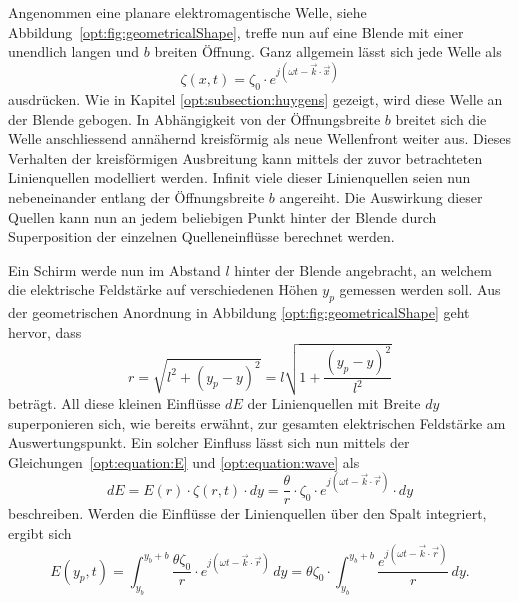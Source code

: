 Angenommen eine planare elektromagentische Welle, siehe Abbildung~\ref{opt:fig:geometricalShape}, treffe nun auf eine Blende mit einer unendlich langen und $b$ breiten Öffnung.
Ganz allgemein lässt sich jede Welle als
\begin{equation}
\zeta(x, t)
=
\zeta_0 \cdot e^{j(\omega t - \vec{k}\cdot\vec{x})}
\label{opt:equation:wave}
\end{equation}
ausdrücken.
Wie in Kapitel \ref{opt:subsection:huygens} gezeigt, wird diese Welle an der Blende gebogen.
In Abhängigkeit von der Öffnungsbreite $b$ breitet sich die Welle anschliessend annähernd kreisförmig als neue Wellenfront weiter aus.
Dieses Verhalten der kreisförmigen Ausbreitung kann mittels der zuvor betrachteten Linienquellen modelliert werden.
Infinit viele dieser Linienquellen seien nun nebeneinander entlang der Öffnungsbreite $b$ angereiht.
Die Auswirkung dieser Quellen kann nun an jedem beliebigen Punkt hinter der Blende durch Superposition der einzelnen Quelleneinflüsse berechnet werden.

Ein Schirm werde nun im Abstand $l$ hinter der Blende angebracht, an welchem die elektrische Feldstärke auf verschiedenen Höhen $y_p$ gemessen werden soll.
Aus der geometrischen Anordnung in Abbildung \ref{opt:fig:geometricalShape} geht hervor, dass
\begin{equation}
r
=
\sqrt{l^2 + (y_p-y)^2}
=
l \sqrt{1 + \frac{(y_p-y)^2}{l^2}}
\label{opt:equation:distance_r}
\end{equation}
beträgt. All diese kleinen Einflüsse $dE$ der Linienquellen mit Breite $dy$ superponieren sich, wie bereits erwähnt, zur gesamten elektrischen Feldstärke am Auswertungspunkt.
Ein solcher Einfluss lässt sich nun mittels der Gleichungen~\ref{opt:equation:E} und \ref{opt:equation:wave} als
\begin{equation}
dE
=
E(r) \cdot \zeta(r, t) \cdot dy
=
\frac{\theta}{r} \cdot \zeta_0 \cdot e^{j(\omega t - \vec{k}\cdot\vec{r})} \cdot dy
\end{equation}
beschreiben.
Werden die Einflüsse der Linienquellen über den Spalt integriert, ergibt sich
\begin{equation}
E(y_p, t)
=
\int_{y_b}^{y_b+b}\frac{\theta\zeta_0}{r} \cdot e^{j(\omega t - \vec{k}\cdot\vec{r})} \,dy
=
\theta\zeta_0 \cdot \int_{y_b}^{y_b+b}\frac{e^{j(\omega t - \vec{k}\cdot\vec{r})}}{r} \,dy
.
\end{equation}

